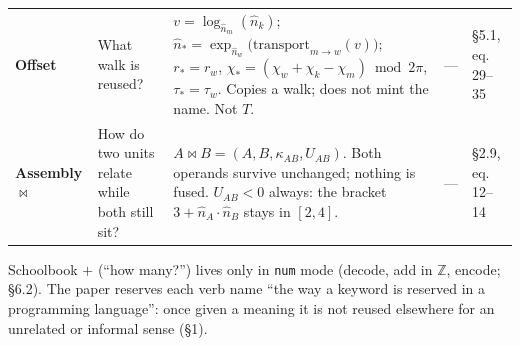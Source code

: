 \documentclass[10.5pt]{article}
\begin{document}
{\begin{longtable}{L{2.2cm}L{2.4cm}L{6.0cm}L{3.6cm}L{1.6cm}}
\textbf{Offset} & What walk is reused? & $v=\log_{\hat n_m}(\hat n_k)$; $\hat n_*=\exp_{\hat n_w}\bigl(\mathrm{transport}_{m\to w}(v)\bigr)$; $r_*=r_w$, $\chi_*=(\chi_w+\chi_k-\chi_m)\bmod2\pi$, $\tau_*=\tau_w$. Copies a walk; does not mint the name. Not $T$. & — & §5.1, eq. 29–35 \\
\textbf{Assembly} $\bowtie$ & How do two units relate while both still sit? & $A\bowtie B=(A,B,\kappa_{AB},U_{AB})$. Both operands survive unchanged; nothing is fused. $U_{AB}<0$ always: the bracket $3+\hat n_A\!\cdot\!\hat n_B$ stays in $[2,4]$. & — & §2.9, eq. 12–14 \\
\bottomrule
\end{longtable}}
Schoolbook $+$ (“how many?”) lives only in \texttt{num} mode (decode, add in $\mathbb Z$, encode; §6.2). The paper reserves each verb name “the way a keyword is reserved in a programming language”: once given a meaning it is not reused elsewhere for an unrelated or informal sense (§1).
\end{document}
